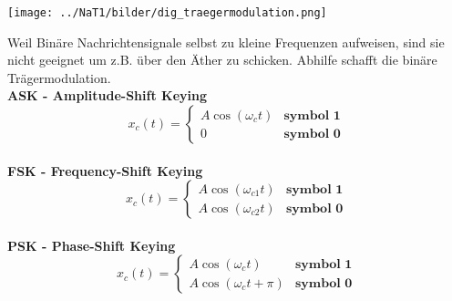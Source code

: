 \begin{minipage}{9cm}
	\texttt{[image: ../NaT1/bilder/dig\_traegermodulation.png]}
\end{minipage}
\begin{minipage}{9cm}
	Weil Binäre Nachrichtensignale selbst zu kleine Frequenzen aufweisen, sind sie nicht geeignet um
	z.B. über den Äther zu schicken. Abhilfe schafft die binäre Trägermodulation. 
	\vspace{1cm}  \\
	\textbf{ASK - Amplitude-Shift Keying} \\
	$$x_c(t) = \begin{cases}
           A \cos(\omega_c t) & \textbf{symbol 1} \\
           0 & \textbf{symbol 0}
           \end{cases} $$ \\
	\textbf{FSK - Frequency-Shift Keying} \\
	$$x_c(t) = \begin{cases}
           A \cos(\omega_{c1} t) & \textbf{symbol 1}     \\         
           A \cos(\omega_{c2} t) & \textbf{symbol 0}
           \end{cases} $$ \\
	\textbf{PSK - Phase-Shift Keying} \\
	$$x_c(t) = \begin{cases}
           A \cos(\omega_{c} t) & \textbf{symbol 1}        \\      
           A \cos(\omega_{c} t + \pi) & \textbf{symbol 0}
           \end{cases} $$ \\
\end{minipage}